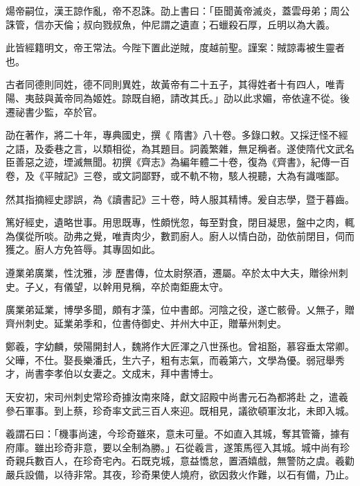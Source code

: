 \begin{pinyinscope}
 煬帝嗣位，漢王諒作亂，帝不忍誅。劭上書曰：「臣聞黃帝滅炎，蓋雲母弟；周公誅管，信亦天倫；叔向戮叔魚，仲尼謂之遺直；石蠟殺石厚，丘明以為大義。



 此皆經籍明文，帝王常法。今陛下置此逆賊，度越前聖。謹案：賊諒毒被生靈者也。



 古者同德則同姓，德不同則異姓，故黃帝有二十五子，其得姓者十有四人，唯青陽、夷鼓與黃帝同為姬姓。諒既自絕，請改其氏。」劭以此求媚，帝依違不從。後遷祕書少監，卒於官。



 劭在著作，將二十年，專典國史，撰《
 隋書》八十卷。多錄口敕。又採迂怪不經之語，及委巷之言，以類相從，為其題目。詞義繁雜，無足稱者。遂使隋代文武名臣善惡之迹，堙滅無聞。初撰《齊志》為編年體二十卷，復為《齊書》，紀傳一百卷，及《平賊記》三卷，或文詞鄙野，或不軌不物，駭人視聽，大為有識嗤鄙。



 然其指摘經史謬誤，為《讀書記》三十卷，時人服其精博。爰自志學，暨于暮齒。



 篤好經史，遺略世事。用思既專，性頗恍忽，每至對食，閉目凝思，盤中之肉，輒為僕從所啖。劭弗之覺，唯責肉少，數罰廚人。廚人以情白劭，劭依前閉目，伺而獲之。廚人方免笞辱。其專固如此。



 遵業弟廣業，性沈雅，涉
 歷書傳，位太尉祭酒，遷屬。卒於太中大夫，贈徐州刺史。子乂，有儀望，以幹用見稱，卒於南鉅鹿太守。



 廣業弟延業，博學多聞，頗有才藻，位中書郎。河陰之役，遂亡骸骨。乂無子，贈齊州刺史。延業弟季和，位書侍御史、并州大中正，贈華州刺史。



 鄭羲，字幼麟，滎陽開封人，魏將作大匠渾之八世孫也。曾祖豁，慕容垂太常卿。父曄，不仕。娶長樂潘氏，生六子，粗有志氣，而羲第六，文學為優。弱冠舉秀才，尚書李孝伯以女妻之。文成末，拜中書博士。



 天安初，宋司州刺史常珍奇據汝南來降，獻文詔殿中尚書元石為都將赴
 之，遣羲參石軍事。到上蔡，珍奇率文武三百人來迎。既相見，議欲頓軍汝北，未即入城。



 羲謂石曰：「機事尚速，今珍奇雖來，意未可量。不如直入其城，奪其管籥，據有府庫。雖出珍奇非意，要以全制為勝。」石從羲言，遂策馬徑入其城。城中尚有珍奇親兵數百人，在珍奇宅內。石既克城，意益憍怠，置酒嬉戲，無警防之虞。羲勸嚴兵設備，以待非常。其夜，珍奇果使人燒府，欲因救火作難，以石有備，乃止。




\end{pinyinscope}
